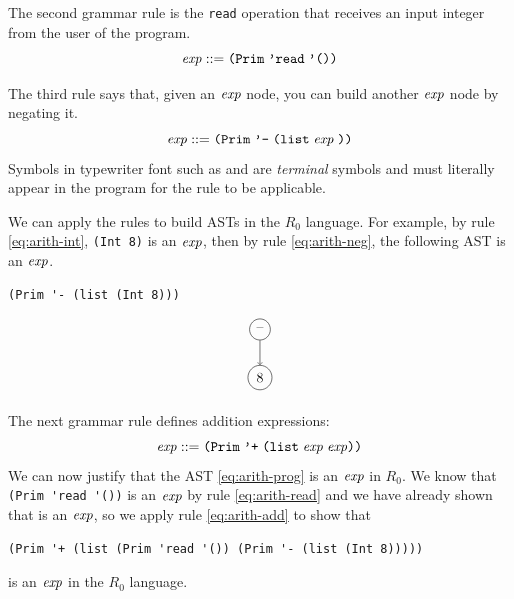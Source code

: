 \documentclass[11pt]{book}
\begin{document}
The second grammar rule is the \texttt{read} operation that receives
an input integer from the user of the program.
\begin{equation}
  \mathit{exp} ::= \texttt{(Prim}\;\texttt{'read}\;\texttt{'())}{} \label{eq:arith-read}
\end{equation}

The third rule says that, given an $\mathit{exp}$ node, you can build another
$\mathit{exp}$ node by negating it.
\begin{equation}
  \mathit{exp} ::= \texttt{(Prim}\;\texttt{'-}\;\texttt{(list}\;\mathit{exp}\;\texttt{))}  \label{eq:arith-neg}
\end{equation}
Symbols in typewriter font such as \key{-} and  are
\emph{terminal} symbols and must literally appear in the program for
the rule to be applicable.

We can apply the rules to build ASTs in the $R_0$
language. For example, by rule \eqref{eq:arith-int}, \texttt{(Int 8)} is an
$\mathit{exp}$, then by rule \eqref{eq:arith-neg}, the following AST is
an $\mathit{exp}$.
\begin{center}
\begin{minipage}{0.4\textwidth}
\begin{lstlisting}
(Prim '- (list (Int 8)))
\end{lstlisting}
\end{minipage}
\begin{minipage}{0.25\textwidth}
\begin{equation}
\begin{tikzpicture}
 \node[draw, circle] (minus) at (0, 0)  {$\text{--}$};
 \node[draw, circle] (8)     at (0, -1.2) {$8$};

 \draw[->] (minus) to (8);
\end{tikzpicture}
\label{eq:arith-neg8}
\end{equation}
\end{minipage}
\end{center}

The next grammar rule defines addition expressions:
\begin{equation}
  \mathit{exp} ::= \texttt{(Prim}\;\texttt{'+}\;\texttt{(list}\;\mathit{exp}\;\mathit{exp}\texttt{))} \label{eq:arith-add}
\end{equation}
We can now justify that the AST \eqref{eq:arith-prog} is an $\mathit{exp}$ in
$R_0$.  We know that \lstinline{(Prim 'read '())} is an $\mathit{exp}$ by rule
\eqref{eq:arith-read} and we have already shown that  is an $\mathit{exp}$, so we apply rule \eqref{eq:arith-add}
to show that
\begin{lstlisting}
(Prim '+ (list (Prim 'read '()) (Prim '- (list (Int 8)))))
\end{lstlisting}
is an $\mathit{exp}$ in the $R_0$ language.
\end{document}
